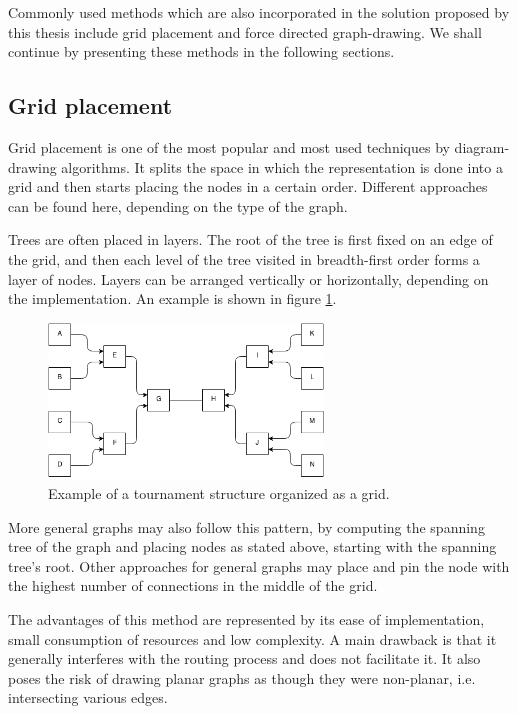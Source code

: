 Commonly used methods which are also incorporated in the solution proposed by this thesis include grid placement and 
force directed graph-drawing. We shall continue by presenting these methods in the following sections.

\subsection{Grid placement}

Grid placement\cite{de1990draw} is one of the most popular and most used techniques by diagram-drawing algorithms. It splits the space in 
which the representation is done into a grid and then starts placing the nodes in a certain order. Different approaches 
can be found here, depending on the type of the graph. 

Trees are often placed in layers. The root of the tree is first fixed on an edge of the grid, and then each level of the tree 
visited in breadth-first order forms a layer of nodes. Layers can be arranged vertically or horizontally, depending on the implementation. An 
example is shown in figure \ref{grid}.

\begin{figure}[ht] \centering
\includegraphics[width=0.65\textwidth]{img/algdesing/grid_example.png}
\caption{Example of a tournament structure organized as a grid. \label{grid}} \end{figure}

More general graphs may also follow this pattern, by computing the spanning tree\cite{graham1985history} of the graph and placing nodes as stated above, 
starting with the spanning tree's root. Other approaches for general graphs may place and pin the node with the highest number of 
connections in the middle of the grid.

The advantages of this method are represented by its ease of implementation, small consumption of resources and low complexity. A main drawback 
is that it generally interferes with the routing process and does not facilitate it. It also poses the risk of drawing planar graphs as though 
they were non-planar, i.e. intersecting various edges.

